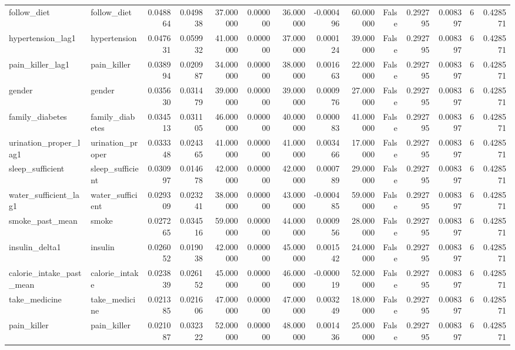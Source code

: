 \begin{longtable}{llrrrrrrrrrrrr}
follow\_diet & follow\_diet & 0.048864 & 0.049838 & 37.000000 & 0.000000 & 36.000000 & -0.000496 & 60.000000 & False & 0.292795 & 0.008397 & 6 & 0.428571 \\
hypertension\_lag1 & hypertension & 0.047631 & 0.059932 & 41.000000 & 0.000000 & 37.000000 & 0.000124 & 39.000000 & False & 0.292795 & 0.008397 & 6 & 0.428571 \\
pain\_killer\_lag1 & pain\_killer & 0.038994 & 0.020987 & 34.000000 & 0.000000 & 38.000000 & 0.001663 & 22.000000 & False & 0.292795 & 0.008397 & 6 & 0.428571 \\
gender & gender & 0.035630 & 0.031479 & 39.000000 & 0.000000 & 39.000000 & 0.000976 & 27.000000 & False & 0.292795 & 0.008397 & 6 & 0.428571 \\
family\_diabetes & family\_diabetes & 0.034513 & 0.031105 & 46.000000 & 0.000000 & 40.000000 & 0.000083 & 41.000000 & False & 0.292795 & 0.008397 & 6 & 0.428571 \\
urination\_proper\_lag1 & urination\_proper & 0.033348 & 0.024365 & 41.000000 & 0.000000 & 41.000000 & 0.003466 & 17.000000 & False & 0.292795 & 0.008397 & 6 & 0.428571 \\
sleep\_sufficient & sleep\_sufficient & 0.030997 & 0.014678 & 42.000000 & 0.000000 & 42.000000 & 0.000789 & 29.000000 & False & 0.292795 & 0.008397 & 6 & 0.428571 \\
water\_sufficient\_lag1 & water\_sufficient & 0.029309 & 0.023241 & 38.000000 & 0.000000 & 43.000000 & -0.000485 & 59.000000 & False & 0.292795 & 0.008397 & 6 & 0.428571 \\
smoke\_past\_mean & smoke & 0.027265 & 0.034516 & 59.000000 & 0.000000 & 44.000000 & 0.000956 & 28.000000 & False & 0.292795 & 0.008397 & 6 & 0.428571 \\
insulin\_delta1 & insulin & 0.026052 & 0.019038 & 42.000000 & 0.000000 & 45.000000 & 0.001542 & 24.000000 & False & 0.292795 & 0.008397 & 6 & 0.428571 \\
calorie\_intake\_past\_mean & calorie\_intake & 0.023839 & 0.026152 & 45.000000 & 0.000000 & 46.000000 & -0.000019 & 52.000000 & False & 0.292795 & 0.008397 & 6 & 0.428571 \\
take\_medicine & take\_medicine & 0.021385 & 0.021606 & 47.000000 & 0.000000 & 47.000000 & 0.003249 & 18.000000 & False & 0.292795 & 0.008397 & 6 & 0.428571 \\
pain\_killer & pain\_killer & 0.021087 & 0.032322 & 52.000000 & 0.000000 & 48.000000 & 0.001436 & 25.000000 & False & 0.292795 & 0.008397 & 6 & 0.428571 \\

\end{longtable}
